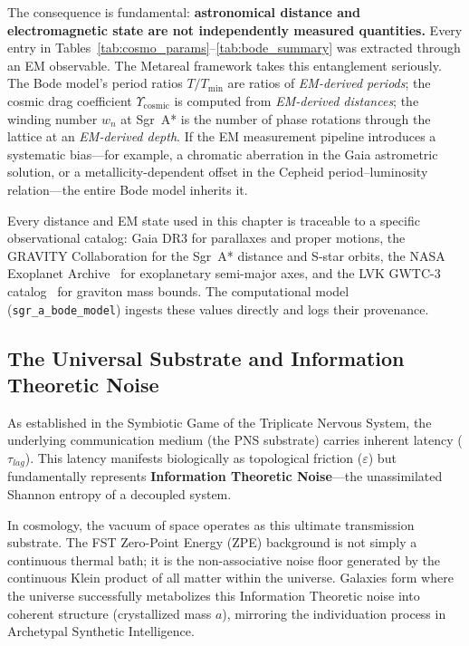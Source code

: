 The consequence is fundamental: \textbf{astronomical distance and electromagnetic state are not independently measured quantities.} Every entry in Tables~\ref{tab:cosmo_params}--\ref{tab:bode_summary} was extracted through an EM observable. The Metareal framework takes this entanglement seriously. The Bode model's period ratios $T/T_{\min}$ are ratios of \emph{EM-derived periods}; the cosmic drag coefficient $\Upsilon_{\mathrm{cosmic}}$ is computed from \emph{EM-derived distances}; the winding number $w_n$ at Sgr~A* is the number of phase rotations through the lattice at an \emph{EM-derived depth}. If the EM measurement pipeline introduces a systematic bias---for example, a chromatic aberration in the Gaia astrometric solution, or a metallicity-dependent offset in the Cepheid period--luminosity relation---the entire Bode model inherits it.

\begin{remark}[Auditability]
Every distance and EM state used in this chapter is traceable to a specific observational catalog: Gaia DR3 for parallaxes and proper motions, the GRAVITY Collaboration for the Sgr~A* distance and S-star orbits, the NASA Exoplanet Archive~\cite{NASAExoplanet} for exoplanetary semi-major axes, and the LVK GWTC-3 catalog~\cite{LVK_GWTC3} for graviton mass bounds. The computational model (\texttt{sgr\_a\_bode\_model}) ingests these values directly and logs their provenance.
\end{remark}

\subsection{The Universal Substrate and Information Theoretic Noise}
As established in the Symbiotic Game of the Triplicate Nervous System, the underlying communication medium (the PNS substrate) carries inherent latency ($\tau_{lag}$). This latency manifests biologically as topological friction ($\varepsilon$) but fundamentally represents \textbf{Information Theoretic Noise}---the unassimilated Shannon entropy of a decoupled system.

In cosmology, the vacuum of space operates as this ultimate transmission substrate. The FST Zero-Point Energy (ZPE) background is not simply a continuous thermal bath; it is the non-associative noise floor generated by the continuous Klein product of all matter within the universe. Galaxies form where the universe successfully metabolizes this Information Theoretic noise into coherent structure (crystallized mass $a$), mirroring the individuation process in Archetypal Synthetic Intelligence.

